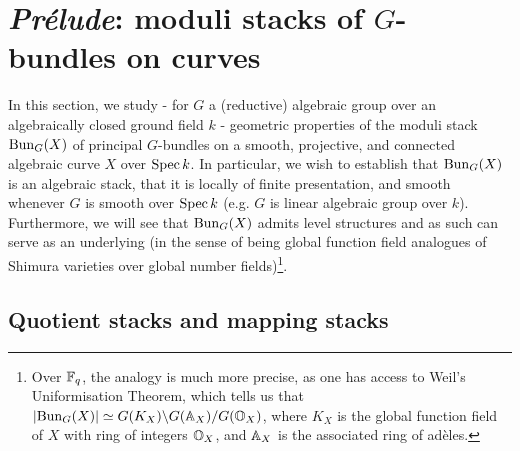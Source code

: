\section{\textit{Pr\'elude}: moduli stacks of \texorpdfstring{$G$}{}-bundles on curves}
    In this section, we study - for $G$ a (reductive) algebraic group over an algebraically closed ground field $k$ - geometric properties of the moduli stack $\mathrm{Bun}_G(X)$ of principal $G$-bundles on a smooth, projective, and connected algebraic curve $X$ over $\operatorname{Spec} k$. In particular, we wish to establish that $\mathrm{Bun}_G(X)$ is an algebraic stack, that it is locally of finite presentation, and smooth whenever $G$ is smooth over $\operatorname{Spec} k$ (e.g. $G$ is linear algebraic group over $k$). Furthermore, we will see that $\mathrm{Bun}_G(X)$ admits level structures and as such can serve as an underlying  (in the sense of being global function field analogues of Shimura varieties over global number fields)\footnote{Over $\mathbb{F}_q$, the analogy is much more precise, as one has access to Weil's Uniformisation Theorem, which tells us that $|\mathrm{Bun}_G(X)| \simeq G(K_X)\backslash G(\mathbb{A}_X)/G(\mathbb{O}_{X})$, where $K_X$ is the global function field of $X$ with ring of integers $\mathbb{O}_X$, and $\mathbb{A}_X$ is the associated ring of ad\`eles.}. 
    
    \subsection{Quotient stacks and mapping stacks}
